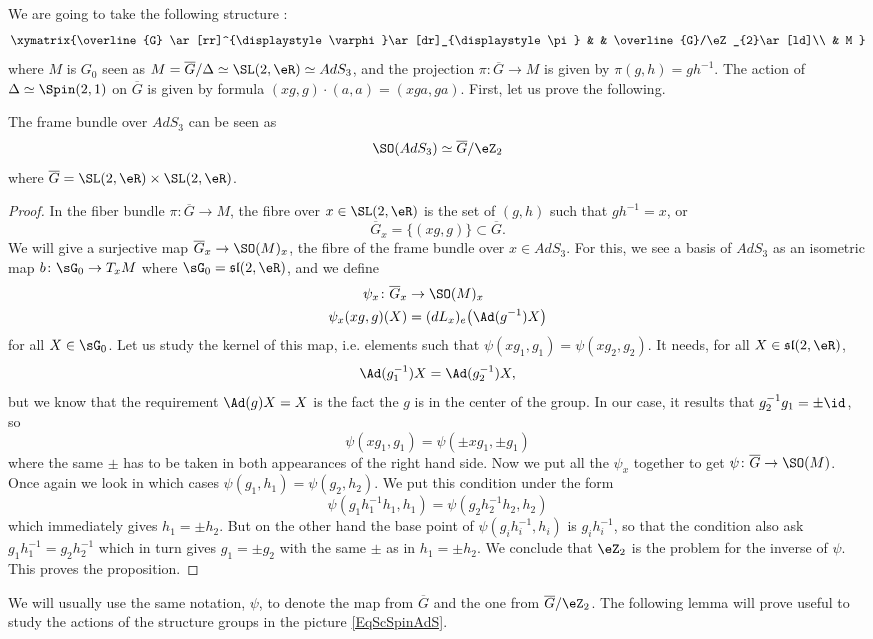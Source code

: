 We are going to take the following structure :
\begin{equation}  \label{EqScSpinAdS}
  \xymatrix{%
   \overline{G} \ar[rr]^{\displaystyle\varphi}\ar[dr]_{\displaystyle\pi}    &   &   \overline{G}/\eZ_{2}\ar[ld]\\
                        & M 
}
\end{equation}
where $M$ is $G_0$ seen as $M=\overline{G}/\Delta\simeq \SL(2,\eR)\simeq AdS_3$, and the projection $\pi\colon \overline{G}\to M$ is given by $\pi(g,h)=gh^{-1}$. The action of $\Delta\simeq \Spin(2,1)$ on $\overline{G}$ is given by formula $(xg,g)\cdot (a,a)=(xga,ga)$. First, let us prove the following.
\begin{proposition}
The frame bundle over $AdS_3$ can be seen as 
\[ 
  \SO(AdS_3)\simeq \overline{G}/\eZ_{2}
\]
where $\overline{G}=\SL(2,\eR)\times\SL(2,\eR)$.
\end{proposition}

\begin{proof}
In the fiber bundle $\pi\colon \overline{G}\to M$, the fibre over $x\in\SL(2,\eR)$ is the set of $(g,h)$ such that $gh^{-1}=x$, or
\[ 
  \overline{G}_{x}=\{ (xg,g) \}\subset \overline{G}.
\]
We will give a surjective map $\overline{G}_{x}\to\SO(M)_{x}$, the fibre of the frame bundle over $x\in AdS_3$. For this, we see a basis of $AdS_3$ as an isometric map $b\colon \sG_0\to T_{x}M$ where $\sG_{0}=\mathfrak{sl}(2,\eR)$, and we define
\begin{equation}
\begin{aligned}
 \psi_{x}\colon \overline{G}_{x}&\to \SO(M)_{x} \\ 
\psi_{x}(xg,g)(X)&=(dL_{x})_{e}\big( \Ad(g^{-1})X \big)
\end{aligned}
\end{equation}
for all $X\in\sG_0$. Let us study the kernel of this map, i.e. elements such that $\psi(xg_1,g_1)=\psi(xg_2,g_2)$. It needs, for all $X\in\mathfrak{sl}(2,\eR)$,
\[ 
  \Ad(g_1^{-1})X=\Ad(g_2^{-1})X,
\]
but we know that the requirement $\Ad(g)X=X$ is the fact the $g$ is in the center of the group. In our case, it results that $g_2^{-1}g_1=\pm\id$, so
\[ 
  \psi(xg_1,g_1)=\psi(\pm xg_1,\pm g_1)
\]
where the same $\pm$ has to be taken in both appearances of the right hand side. Now we put all the $\psi_{x}$ together to get $\psi\colon \overline{G}\to \SO(M)$. Once again we look in which cases $\psi(g_1,h_1)=\psi(g_2,h_2)$. We put this condition under the form
\[ 
  \psi(g_1h_1^{-1}h_1,h_1)=\psi(g_2h_2^{-1}h_2,h_2)
\]
which immediately gives $h_1=\pm h_2$. But on the other hand the base point of $\psi(g_{i}h_{i}^{-1},h_{i})$ is $g_{i}h_{i}^{-1}$, so that the condition also ask $g_1h_1^{-1}=g_2h_2^{-1}$ which in turn gives $g_1=\pm g_2$ with the same $\pm$ as in $h_1=\pm h_2$. We conclude that $\eZ_{2}$ is the problem for the inverse of $\psi$. This proves the proposition.
\end{proof}
We will usually use the same notation, $\psi$, to denote the map from $\overline{G}$ and the one from $\overline{G}/\eZ_{2}$. The following lemma will prove useful to study the actions of the structure groups in the picture \eqref{EqScSpinAdS}.

